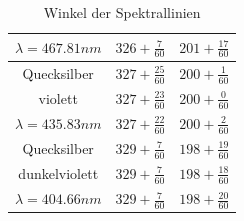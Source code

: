 \documentclass[12pt,a4paper]{article}
\begin{document}
\begin{table}[h!]
\begin{tabular}{|c|c|c|}
		$\lambda=467.81nm$&$326+\frac{7}{60}$&$201+\frac{17}{60}$\\[0.1cm]
		\hline
		Quecksilber&$327+\frac{25}{60}$&$200+\frac{1}{60}$\\[0.1cm]
		violett&$327+\frac{23}{60}$&$200+\frac{0}{60}$\\[0.1cm]
		$\lambda=435.83nm$&$327+\frac{22}{60}$&$200+\frac{2}{60}$\\[0.1cm]
		\hline
		Quecksilber&$329+\frac{7}{60}$&$198+\frac{19}{60}$\\[0.1cm]
		dunkelviolett&$329+\frac{7}{60}$&$198+\frac{18}{60}$\\[0.1cm]
		$\lambda=404.66nm$&$329+\frac{7}{60}$&$198+\frac{20}{60}$\\[0.1cm]
		\hline
	\end{tabular}
	\caption{Winkel der Spektrallinien}
	\label{table:Winkel_Rohdaten}
\end{table}
\end{document}
